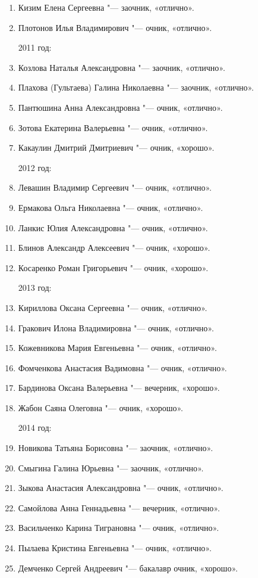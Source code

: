 \begin{enumerate}[nosep]
{2010 год:}
	\item Кизим Елена Сергеевна "--- заочник, «отлично».
	\item Плотонов Илья Владимирович "--- очник, «отлично».
	
{2011 год:}
	\item Козлова Наталья Александровна "--- заочник, «отлично».
	\item Плахова (Гультаева) Галина Николаевна "--- заочник, «отлично».
	\item Пантюшина Анна Александровна "--- очник, «отлично».
	\item Зотова Екатерина Валерьевна "--- очник, «отлично».
	\item Какаулин Дмитрий Дмитриевич "--- очник, «хорошо».
	
{2012 год:}
	\item Левашин Владимир Сергеевич "--- очник, «отлично».
	\item Ермакова Ольга Николаевна "--- очник, «отлично».
	\item Ланкис Юлия Александровна "--- очник, «отлично».
	\item Блинов Александр Алексеевич "--- очник, «хорошо».
	\item Косаренко Роман Григорьевич "--- очник, «хорошо».
	
{2013 год:}
	\item Кириллова Оксана Сергеевна "--- очник, «отлично».
	\item Гракович Илона Владимировна "--- очник, «отлично».
	\item Кожевникова Мария Евгеньевна "--- очник, «отлично».
	\item Фомченкова Анастасия Вадимовна "--- очник, «отлично».
	\item Бардинова Оксана Валерьевна "--- вечерник, «хорошо».
	\item Жабон Саяна Олеговна "--- очник, «хорошо».
	
{2014 год:}
	\item Новикова Татьяна Борисовна "--- заочник, «отлично».
	\item Смыгина Галина Юрьевна "--- заочник, «отлично».
	\item Зыкова Анастасия Александровна "--- очник, «отлично».
	\item Самойлова Анна Геннадьевна "--- вечерник, «отлично».
	\item Васильченко Карина Тиграновна "--- очник, «отлично».
	\item Пылаева Кристина Евгеньевна "--- очник, «отлично».
	\item Демченко Сергей Андреевич "--- бакалавр очник, «хорошо».
	

\end{enumerate}

